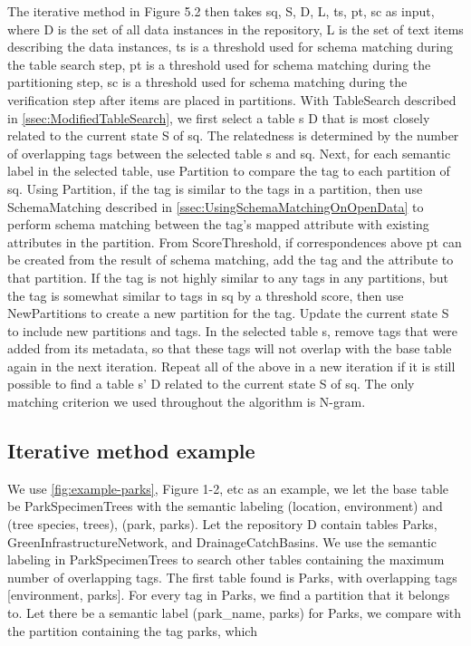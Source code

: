 The iterative method in Figure 5.2 then takes sq, S, D, L, ts, pt, sc as input, where D is the set of all data instances in the repository, L is the set of text items describing the data instances, ts is a threshold used for schema matching during the table search step, pt is a threshold used for schema matching during the partitioning step, sc is a threshold used for schema matching during the verification step after items are placed in partitions.
With TableSearch described in \autoref{ssec:ModifiedTableSearch}, we first select a table s  D that is most closely related to the current state S of sq. The relatedness is determined by the number of overlapping tags between the selected table s and sq. Next, for each semantic label in the selected table, use Partition to compare the tag to each partition of sq. Using Partition, if the tag is similar to the tags in a partition, then use SchemaMatching described in \autoref{ssec:UsingSchemaMatchingOnOpenData} to perform schema matching between the tag's mapped attribute with existing attributes in the partition. From ScoreThreshold, if correspondences above pt can be created from the result of schema matching, add the tag and the attribute to that partition. If the tag is not highly similar to any tags in any partitions, but the tag is somewhat similar to tags in sq by a threshold score, then use NewPartitions to create a new partition for the tag. Update the current state S to include new partitions and tags. In the selected table s, remove tags that were added from its metadata, so that these tags will not overlap with the base table again in the next iteration. Repeat all of the above in a new iteration if it is still possible to find a table s'  D related to the current state S of sq. The only matching criterion we used throughout the algorithm is N-gram.

\subsection{Iterative method example}
\label{ssec:IterativeMethodExample}

We use \autoref{fig:example-parks}, Figure 1-2, etc as an example, we let the base table be ParkSpecimenTrees with the semantic labeling (location, environment) and (tree species, trees), (park, parks). Let the repository D contain tables Parks, GreenInfrastructureNetwork, and DrainageCatchBasins. We use the semantic labeling in ParkSpecimenTrees to search other tables containing the maximum number of overlapping tags. The first table found is Parks, with overlapping tags [environment, parks]. For every tag in Parks, we find a partition that it belongs to. Let there be a semantic label (park\_name, parks) for Parks, we compare with the partition containing the tag parks, which

